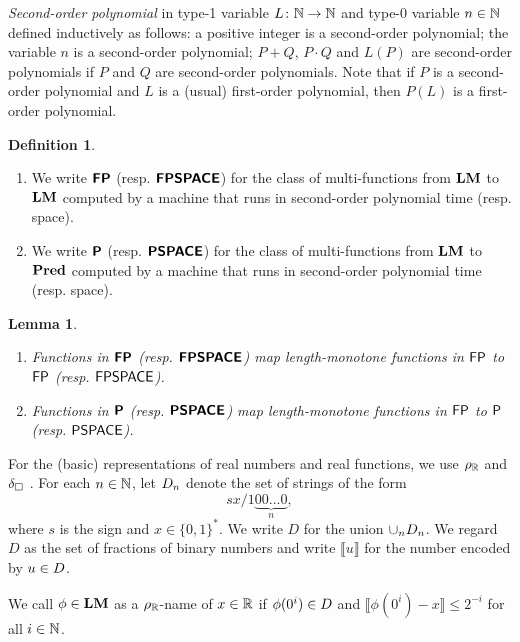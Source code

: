 \documentclass{article}
\newtheorem{lemma}[theorem]{Lemma}
\theoremstyle{definition}
\newtheorem{definition}[theorem]{Definition}
\theoremstyle{remark}
\begin{document}
\emph{Second-order polynomial} in type-1 variable $L \colon \mathbb N \to \mathbb N$
and type-0 variable $n \in \mathbb N$ 
defined inductively as follows:
a positive integer is a second-order polynomial;
the variable $n$ is a second-order polynomial;
$P+Q$, $P \cdot Q$ and $L(P)$ are
second-order polynomials if $P$ and $Q$ are second-order polynomials.
Note that if $P$ is a second-order polynomial and $L$ is a (usual) first-order
polynomial, then $P(L)$ is a first-order polynomial.

\begin{definition}
\begin{enumerate}
 \item We write $\text{\bfseries \sffamily \upshape FP}$ (resp. $\text{\bfseries \sffamily \upshape FPSPACE}$) for the class of
       multi-functions from $\mathbf{LM}$ to $\mathbf{LM}$ computed by a machine that runs
       in second-order polynomial time (resp. space).
 \item We write $\text{\bfseries \sffamily \upshape P}$ (resp. $\text{\bfseries \sffamily \upshape PSPACE}$) for the class of
       multi-functions from $\mathbf{LM}$ to $\mathbf{Pred}$ computed by a machine that runs
       in second-order polynomial time (resp. space).
\end{enumerate}
\end{definition}

\begin{lemma}
 \begin{enumerate}
  \item Functions in $\text{\bfseries \sffamily \upshape FP}$ (resp. $\text{\bfseries \sffamily \upshape FPSPACE}$) map 
	length-monotone functions in $\mathsf{FP}$ to $\mathsf{FP}$ 
	(resp. $\mathsf{FPSPACE}$).
  \item Functions in $\text{\bfseries \sffamily \upshape P}$ (resp. $\text{\bfseries \sffamily \upshape PSPACE}$) map 
	length-monotone functions in $\mathsf{FP}$ to $\mathsf{P}$
	(resp. $\mathsf{PSPACE}$).
 \end{enumerate}
\end{lemma}





For the (basic) representations of real numbers and real functions,
we use $\rho _\mathbb R$ and $\delta _\square$ \cite{kawamura2012complexity}.
For each $n \in \mathbb N$, let $D_n$ denote the set of strings of the form
\begin{equation}
 sx/1\!\underbrace{00\dots0}_{n},
\end{equation}
where $s$ is the sign and $x \in \{0,1\}^*$.
We write $D$ for the union $\cup_n D_n$.
We regard $D$ as the set of fractions of binary numbers
and write $\llbracket u \rrbracket$ for the number encoded by $u \in D$.

We call $\phi \in \mathbf{LM}$ as a $\rho _\mathbb R$-name of $x \in \mathbb R$ 
if $\phi(0^i) \in D$ and $\llbracket \phi(0^i) - x \rrbracket \le 2^{-i}$
for all $i \in \mathbb N$.
\end{document}
